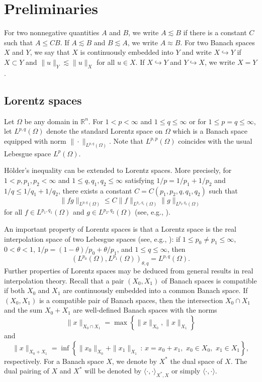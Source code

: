 \documentclass[reqno,centertags,11pt]{amsart}
\theoremstyle{definition}
\numberwithin{thm}{section}
\numberwithin{equation}{section}
\newcommand{\R}{{\mathbb{R}}}
\begin{document}
\section{Preliminaries}


For two nonnegative quantities $A$ and $B$, we write $A \lesssim B$ if there is a constant $C$ such that $A \le C B$. If $A \lesssim B$ and $B \lesssim A$, we write $A \approx B$.
For two Banach spaces $X$ and $Y$, we say that $X$ is continuously embedded into $Y$ and write $X \hookrightarrow Y$ if    $X \subset Y$ and  $\| u \|_Y \lesssim \|u\|_{X}$ for all $u \in X$. If $X \hookrightarrow Y$ and $Y \hookrightarrow X$, we write $X=Y$.

\subsection{Lorentz spaces}

Let $\Omega$ be any domain in $\R^n$. For    $1<  p<\infty$  and $1 \le q \le \infty$ or for $1\le p=q \le \infty$, let $ L^{p,q} (\Omega )$ denote the standard Lorentz space on $\Omega$ which is a Banach space equipped with norm $\|\cdot \|_{L^{p,q} (\Omega )}$. Note that $ L^{p,p} (\Omega  )$ coincides with the usual Lebesgue space $L^p (\Omega )$.

H\"{o}lder's inequality can be extended to Lorentz spaces. More precisely, for $1< p,p_1,p_2<\infty$ and  $1\le q,q_1,q_2 \le \infty$ satisfying  $1/p =1/p_1 +1/p_2$ and $1/q \le 1/q_1 +1/q_2$, there exists a constant $C=C(p_1,p_2,q,q_1,q_2)$ such that
\begin{equation}\label{Holder-L}
\|fg\|_{L^{p,q}(\Omega )}\le C \|f\|_{L^{p_1,q_1}(\Omega )} \|g\|_{L^{p_2,q_2}(\Omega)}
\end{equation}
for all $f \in L^{p_1,q_1}(\Omega )$ and $g \in L^{p_2, q_2}(\Omega )$ (see, e.g., \cite[Lemma 2.3]{KO}).

An important property of Lorentz spaces is that a Lorentz space is the real interpolation space of two Lebesgue spaces (see, e.g., \cite[Theorem 5.3.1]{bergh}):    if $ 1 \le   p_0 \neq p_1 \le  \infty $, $0<\theta<1$,   $1/p =(1-\theta)/p_0 + \theta /p_1$, and $1 \le q \le \infty$,
then
\begin{equation}\label{interpolation for L}
\left( L^{p_0 }(\Omega ), L^{p_1}(\Omega ) \right)_{\theta,q} = L^{p,q}(\Omega ).
\end{equation}
Further properties of Lorentz spaces may be deduced from    general results in  real interpolation theory.
Recall that a pair $(X_0 , X_1 )$ of Banach spaces is   compatible if both $X_0$ and $X_1$  are continuously embedded into a common Banach space. If $(X_0 , X_1 )$ is a compatible pair of Banach spaces, then the intersection $X_0 \cap X_1$ and the sum $X_0 +X_1$ are well-defined Banach spaces with the norms
\[
\|x\|_{X_0 \cap X_1}= \max \left\{\|x\|_{X_0} , \|x\|_{X_1} \right\}
\]
and
\[
\|x\|_{X_0 + X_1}= \inf \left\{ \|x_0 \|_{X_0}+ \|x_1\|_{X_1} \,:\, x=x_0 +x_1 ,\,\, x_0 \in X_0 ,\,\,x_1 \in X_1 \right\},
\]
respectively. For a Banach space $X$, we denote by  $X^*$  the dual space of $X$. The dual pairing of   $X$ and   $X^*$ will be  denoted by  $ \langle \cdot , \cdot \rangle_{X^* ,X}$ or simply $ \langle \cdot , \cdot \rangle$.
\end{document}
